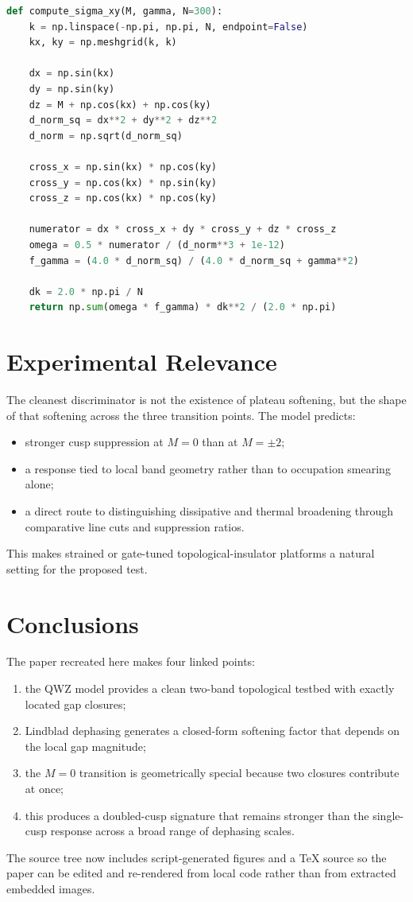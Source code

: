 \documentclass[11pt]{article}
\begin{document}
\begin{lstlisting}[language=Python]
def compute_sigma_xy(M, gamma, N=300):
    k = np.linspace(-np.pi, np.pi, N, endpoint=False)
    kx, ky = np.meshgrid(k, k)

    dx = np.sin(kx)
    dy = np.sin(ky)
    dz = M + np.cos(kx) + np.cos(ky)
    d_norm_sq = dx**2 + dy**2 + dz**2
    d_norm = np.sqrt(d_norm_sq)

    cross_x = np.sin(kx) * np.cos(ky)
    cross_y = np.cos(kx) * np.sin(ky)
    cross_z = np.cos(kx) * np.cos(ky)

    numerator = dx * cross_x + dy * cross_y + dz * cross_z
    omega = 0.5 * numerator / (d_norm**3 + 1e-12)
    f_gamma = (4.0 * d_norm_sq) / (4.0 * d_norm_sq + gamma**2)

    dk = 2.0 * np.pi / N
    return np.sum(omega * f_gamma) * dk**2 / (2.0 * np.pi)
\end{lstlisting}

\section{Experimental Relevance}

The cleanest discriminator is not the existence of plateau softening, but the shape of that softening across the three transition points. The model predicts:
\begin{itemize}
\item stronger cusp suppression at $M=0$ than at $M=\pm 2$;
\item a response tied to local band geometry rather than to occupation smearing alone;
\item a direct route to distinguishing dissipative and thermal broadening through comparative line cuts and suppression ratios.
\end{itemize}
This makes strained or gate-tuned topological-insulator platforms a natural setting for the proposed test.

\section{Conclusions}

The paper recreated here makes four linked points:
\begin{enumerate}
\item the QWZ model provides a clean two-band topological testbed with exactly located gap closures;
\item Lindblad dephasing generates a closed-form softening factor that depends on the local gap magnitude;
\item the $M=0$ transition is geometrically special because two closures contribute at once;
\item this produces a doubled-cusp signature that remains stronger than the single-cusp response across a broad range of dephasing scales.
\end{enumerate}
The source tree now includes script-generated figures and a TeX source so the paper can be edited and re-rendered from local code rather than from extracted embedded images.
\end{document}
